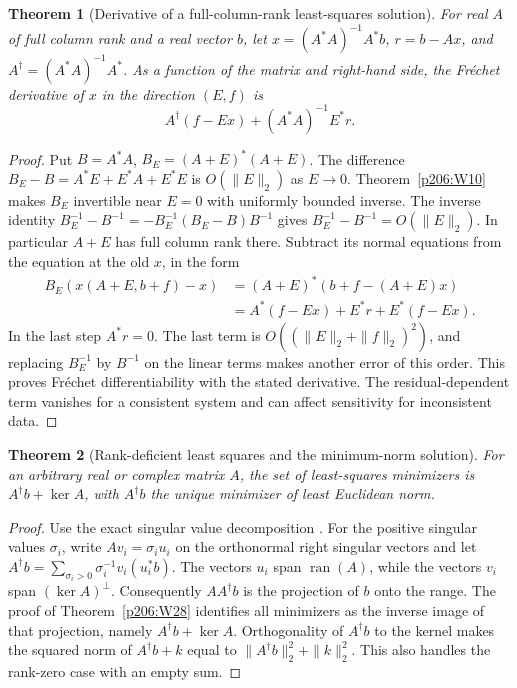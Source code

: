 \documentclass[11pt,oneside,openany]{book}
\theoremstyle{plain}
\newtheorem{theorem}{Theorem}[chapter]
\theoremstyle{definition}
\theoremstyle{remark}
\begin{document}
\begin{theorem}[Derivative of a full-column-rank least-squares solution]
\label{p206:W34}
For real \(A\) of full column rank and a real vector \(b\),
let \(x=(A^*A)^{-1}A^*b\), \(r=b-Ax\), and
\(A^\dagger=(A^*A)^{-1}A^*\). As a function of the matrix and
right-hand side, the Fr\'echet derivative of \(x\) in the
direction \((E,f)\) is
\[
             A^\dagger(f-Ex)+(A^*A)^{-1}E^*r .
\]
\end{theorem}

\begin{proof}
Put \(B=A^*A\), \(B_E=(A+E)^*(A+E)\). The difference
\(B_E-B=A^*E+E^*A+E^*E\) is \(O(\|E\|_2)\) as \(E\to0\).
Theorem~\ref{p206:W10} makes \(B_E\) invertible near \(E=0\)
with uniformly bounded inverse. The inverse identity
\(B_E^{-1}-B^{-1}=-B_E^{-1}(B_E-B)B^{-1}\)
gives \(B_E^{-1}-B^{-1}=O(\|E\|_2)\). In particular \(A+E\)
has full column rank there. Subtract its normal equations
from the equation at the old \(x\), in the form
\[
 \begin{aligned}
  B_E(x(A+E,b+f)-x)
      &=(A+E)^*(b+f-(A+E)x)\\
      &= A^*(f-Ex)+E^*r+E^*(f-Ex).
 \end{aligned}
\]
In the last step \(A^*r=0\). The last term is
\(O((\|E\|_2+\|f\|_2)^2)\), and replacing \(B_E^{-1}\) by
\(B^{-1}\) on the linear terms makes another error of this
order. This proves Fr\'echet differentiability with the stated
derivative. The residual-dependent term vanishes for a consistent
system and can affect sensitivity for inconsistent data.
\end{proof}

\begin{theorem}[Rank-deficient least squares and the minimum-norm solution]
\label{p206:W35}
For an arbitrary real or complex matrix \(A\), the set of
least-squares minimizers is \(A^\dagger b+\ker A\), with
\(A^\dagger b\) the unique minimizer of least Euclidean norm.
\end{theorem}

\begin{proof}
Use the exact singular value decomposition
\cite[entry 14.svd]{d05}. For the positive singular values
\(\sigma_i\), write \(Av_i=\sigma_i u_i\) on the orthonormal
right singular vectors and let \(A^\dagger b=
\sum_{\sigma_i>0}\sigma_i^{-1}v_i(u_i^*b)\).
The vectors \(u_i\) span \(\operatorname{ran}(A)\), while the
vectors \(v_i\) span \((\ker A)^\perp\).
Consequently \(AA^\dagger b\) is the projection of \(b\)
onto the range. The proof of Theorem~\ref{p206:W28} identifies
all minimizers as the inverse image of that projection, namely
\(A^\dagger b+\ker A\). Orthogonality of \(A^\dagger b\) to
the kernel makes the squared norm of \(A^\dagger b+k\)
equal to \(\|A^\dagger b\|_2^2+\|k\|_2^2\).
This also handles the rank-zero case with an empty sum.
\end{proof}
\end{document}
